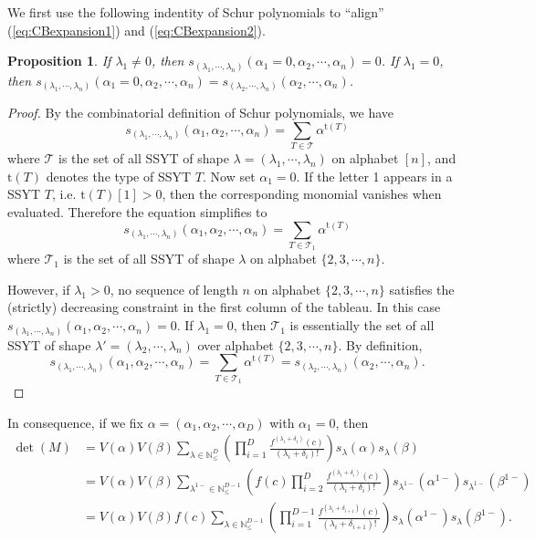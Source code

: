 \documentclass[10pt,a4paper]{article}
\newtheorem{proposition}[theorem]{Proposition}
\theoremstyle{remark}
\numberwithin{equation}{section}
\numberwithin{theorem}{section}
\newcommand{\N}{\ensuremath{\mathbb{N}}}
\begin{document}
We first use the following indentity of Schur polynomials to ``align'' (\ref{eq:CBexpansion1}) and (\ref{eq:CBexpansion2}).
\begin{proposition}
If $\lambda_1 \ne 0$, then
$s_{(\lambda_1, \cdots, \lambda_n)}(\alpha_1 = 0, \alpha_2, \cdots, \alpha_n) =0$.
If $\lambda_1 = 0$, then
$s_{(\lambda_1, \cdots, \lambda_n)}(\alpha_1 = 0, \alpha_2, \cdots, \alpha_n) =
s_{(\lambda_2, \cdots, \lambda_n)}(\alpha_2, \cdots, \alpha_n)$.
\end{proposition}
\begin{proof}
By the combinatorial definition of Schur polynomials, we have
\[s_{(\lambda_1, \cdots, \lambda_n)}(\alpha_1, \alpha_2, \cdots, \alpha_n)
=\sum_{T \in \mathcal T} \alpha^{\mathrm t(T)}\]
where $\mathcal T$ is the set of all SSYT of shape $\lambda = (\lambda_1, \cdots, \lambda_n)$
on alphabet $[n]$, and $\mathrm t(T)$ denotes the type of SSYT $T$.
Now set $\alpha_1 = 0$. If the letter 1 appears in a SSYT $T$, i.e. $\mathrm t(T)[1] > 0$, then the corresponding monomial vanishes when evaluated. Therefore the equation simplifies to
\[s_{(\lambda_1, \cdots, \lambda_n)}(\alpha_1, \alpha_2, \cdots, \alpha_n)
=\sum_{T\in \mathcal T_1} \alpha^{\mathrm t(T)}\]
where $\mathcal T_1$ is the set of all SSYT of shape $\lambda$ on alphabet $\{2, 3, \cdots, n\}$.

However, if $\lambda_1 > 0$, no sequence of length $n$ on alphabet $\{2, 3, \cdots, n\}$
satisfies the (strictly) decreasing constraint in the first column of the tableau.
In this case $s_{(\lambda_1, \cdots, \lambda_n)}(\alpha_1, \alpha_2, \cdots, \alpha_n) = 0$.
If $\lambda_1 = 0$, then $\mathcal T_1$ is essentially the set of all SSYT of shape $\lambda'
=(\lambda_2, \cdots, \lambda_n)$ over alphabet $\{2, 3, \cdots, n\}$.
By definition,
\[s_{(\lambda_1, \cdots, \lambda_n)}(\alpha_1, \alpha_2, \cdots, \alpha_n)
=\sum_{T\in \mathcal T_1} \alpha^{\mathrm t(T)}
=s_{(\lambda_2, \cdots, \lambda_n)}(\alpha_2, \cdots, \alpha_n).\]
\end{proof}
In consequence, if we fix $\alpha = (\alpha_1, \alpha_2, \cdots, \alpha_D)$
with $\alpha_1 = 0$, then
\begin{align*}
\det(M) &= V(\alpha)V(\beta) \sum_{\lambda \in \N^D_{\le}}
\left(\prod_{i=1}^D \frac{f^{(\lambda_i + \delta_i)}(c)}{(\lambda_i + \delta_i)!}\right)
s_{\lambda}(\alpha)s_{\lambda}(\beta)\\
&= V(\alpha)V(\beta) \sum_{\lambda^{1-} \in \N^{D-1}_{\le}}
\left(f(c) \prod_{i=2}^{D} \frac{f^{(\lambda_i + \delta_i)}(c)}{(\lambda_i + \delta_i)!}\right)
s_{\lambda^{1-}}(\alpha^{1-})s_{\lambda^{1-}}(\beta^{1-})\\
&= V(\alpha)V(\beta) f(c) \sum_{\lambda \in \N^{D-1}_{\le}}
\left(\prod_{i=1}^{D-1} \frac{f^{(\lambda_i + \delta_{i+1})}(c)}{(\lambda_i + \delta_{i+1})!}\right)
s_{\lambda}(\alpha^{1-})s_{\lambda}(\beta^{1-}).
\end{align*}
\end{document}
